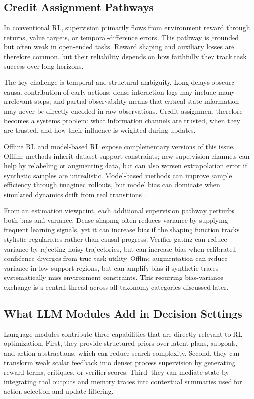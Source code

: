 ﻿\documentclass[conference]{IEEEtran}
\begin{document}
\subsection{Credit Assignment Pathways}
In conventional RL, supervision primarily flows from environment reward through returns, value targets, or temporal-difference errors. This pathway is grounded but often weak in open-ended tasks. Reward shaping and auxiliary losses are therefore common, but their reliability depends on how faithfully they track task success over long horizons.

The key challenge is temporal and structural ambiguity. Long delays obscure causal contribution of early actions; dense interaction logs may include many irrelevant steps; and partial observability means that critical state information may never be directly encoded in raw observations. Credit assignment therefore becomes a systems problem: what information channels are trusted, when they are trusted, and how their influence is weighted during updates.

Offline RL and model-based RL expose complementary versions of this issue. Offline methods inherit dataset support constraints; new supervision channels can help by relabeling or augmenting data, but can also worsen extrapolation error if synthetic samples are unrealistic. Model-based methods can improve sample efficiency through imagined rollouts, but model bias can dominate when simulated dynamics drift from real transitions \cite{arxiv_p_2301_12050,arxiv_p_2602_02454,arxiv_p_2602_11075,arxiv_p_2602_00785}.

From an estimation viewpoint, each additional supervision pathway perturbs both bias and variance. Dense shaping often reduces variance by supplying frequent learning signals, yet it can increase bias if the shaping function tracks stylistic regularities rather than causal progress. Verifier gating can reduce variance by rejecting noisy trajectories, but can increase bias when calibrated confidence diverges from true task utility. Offline augmentation can reduce variance in low-support regions, but can amplify bias if synthetic traces systematically miss environment constraints. This recurring bias-variance exchange is a central thread across all taxonomy categories discussed later.

\subsection{What LLM Modules Add in Decision Settings}
Language modules contribute three capabilities that are directly relevant to RL optimization. First, they provide structured priors over latent plans, subgoals, and action abstractions, which can reduce search complexity. Second, they can transform weak scalar feedback into denser process supervision by generating reward terms, critiques, or verifier scores. Third, they can mediate state by integrating tool outputs and memory traces into contextual summaries used for action selection and update filtering.
\end{document}

